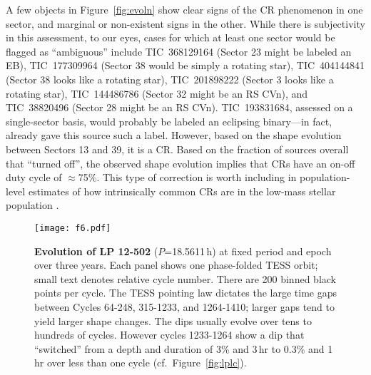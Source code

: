 \documentclass[11pt,twocolumn,tighten]{aastex63}
\begin{document}
A few objects in Figure~\ref{fig:evoln}
show clear signs of
the CR phenomenon in one sector, and marginal or non-existent signs
in the other.  While there is subjectivity in this assessment, to our
eyes, cases for which at least one sector would be flagged as
``ambiguous'' include
TIC~368129164 (Sector 23 might be labeled an EB),
TIC~177309964 (Sector 38 would be simply a rotating star),
TIC~404144841 (Sector 38 looks like a rotating star),
TIC~201898222 (Sector 3 looks like a rotating star),
TIC~144486786 (Sector 32 might be an RS CVn),
and
TIC~38820496 (Sector 28 might be an RS CVn).
TIC~193831684, assessed on a single-sector basis, would probably be
labeled an eclipsing binary---in fact, \citet{2021ApJ...912..123J}
already gave this source such a label.  However,
based on the shape evolution between Sectors 13 and 39, it is a
CR.  Based on the fraction of sources overall that ``turned off'',
the observed shape evolution implies that CRs have an on-off duty cycle of
$\approx$75\%.  This type of correction is worth including in
population-level estimates of how intrinsically common CRs are in the
low-mass stellar population \citep[e.g.][]{2022AJ....163..144G}.



\begin{figure*}[!t]
	\begin{center}
		\centering
		\texttt{[image: f6.pdf]}
		\vspace{-0.3cm}
		\caption{
			{\bf Evolution of LP 12-502} ($P$=18.5611\,h) at fixed period and
			epoch over three years.  Each panel shows one phase-folded TESS
			orbit; small text denotes relative cycle number.  There are 200
			binned black points per cycle.  The TESS pointing law dictates
			the large time gaps between Cycles 64-248, 315-1233, and
			1264-1410; larger gaps tend to yield larger shape changes.  The
			dips usually evolve over tens to hundreds of cycles.  However
			cycles 1233-1264 show a dip that ``switched'' from a depth and
			duration of 3\% and 3\,hr to 0.3\% and 1\,hr over less than one
			cycle (cf.~Figure~\ref{fig:lplc}).
		}
		\label{fig:lp}
	\end{center}
\end{figure*}
\end{document}
